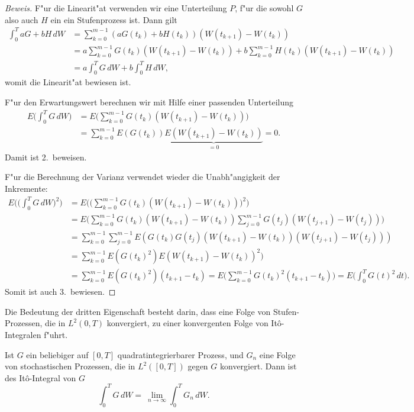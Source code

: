 \begin{proof}[Beweis]
F"ur die Linearit"at verwenden wir eine Unterteilung $P$, f"ur die sowohl
$G$ also auch $H$ ein ein Stufenprozess ist.
Dann gilt
\begin{align*}
\int_0^T aG+bH\,dW
&=
\sum_{k=0}^{m-1} (aG(t_k)+bH(t_k))(W(t_{k+1})-W(t_k))
\\
&=
a\sum_{k=0}^{m-1} G(t_k)(W(t_{k+1})-W(t_k))
+
b\sum_{k=0}^{m-1} H(t_k)(W(t_{k+1})-W(t_k))
\\
&=a\int_0^TG\,dW+b\int_0^TH\,dW,
\end{align*}
womit die Linearit"at bewiesen ist.

F"ur den Erwartungswert berechnen wir mit Hilfe einer passenden Unterteilung
\begin{align*}
E\biggl(\int_0^T G\,dW\biggr)
&=
E\biggl(\sum_{k=0}^{m-1} G(t_k) (W(t_{k+1}) - W(t_k))\biggr)
\\
&=
\sum_{k=0}^{m-1} E(G(t_k)) \underbrace{E(W(t_{k+1}) - W(t_k))}_{\textstyle =0}=0.
\end{align*}
Damit ist 2.~beweisen.

F"ur die Berechnung der Varianz verwendet wieder die Unabh"angigkeit der
Inkremente:
\begin{align*}
E\biggl(\biggl(\int_0^T G\,dW\biggr)^2\biggr)
&=
E\biggl(\biggl(\sum_{k=0}^{m-1}G(t_k)(W(t_{k+1})-W(t_k))\biggr)^2\biggr)
\\
&=
E\biggl(
\sum_{k=0}^{m-1}G(t_k)(W(t_{k+1})-W(t_k))
\sum_{j=0}^{m-1}G(t_j)(W(t_{j+1})-W(t_j))
\biggr)
\\
&=
\sum_{k=0}^{m-1}
\sum_{j=0}^{m-1}
E(G(t_k) G(t_j)
(W(t_{k+1})-W(t_k))
(W(t_{j+1})-W(t_j))
)
\\
&=
\sum_{k=0}^{m-1}
E(G(t_k)^2) E(W(t_{k+1})-W(t_k))^2)
\\
&=
\sum_{k=0}^{m-1}
E(G(t_k)^2) (t_{k+1}-t_k)
=
E\biggl(
\sum_{k=0}^{m-1}
G(t_k)^2 (t_{k+1}-t_k)
\biggr)
=E\biggl(\int_0^T G(t)^2\,dt\biggr).
\end{align*}
Somit ist auch 3.~bewiesen.
\end{proof}

Die Bedeutung der dritten Eigenschaft besteht darin, dass eine
Folge von Stufen-Prozessen, die in $L^2(0,T)$ konvergiert, zu einer
konvergenten Folge von It\^o-Integralen f"uhrt.

\begin{definition}
%
%
Ist $G$ ein beliebiger auf $[0,T]$ quadratintegrierbarer Prozess,
und $G_n$ eine Folge von stochastischen Prozessen, die in $L^2([0,T])$
gegen $G$ konvergiert.
Dann ist des It\^o-Integral von $G$
\[
\int_0^T G\,dW
=
\
\lim_{n\to\infty} \int_0^T G_n\,dW.
\]
\end{definition}


